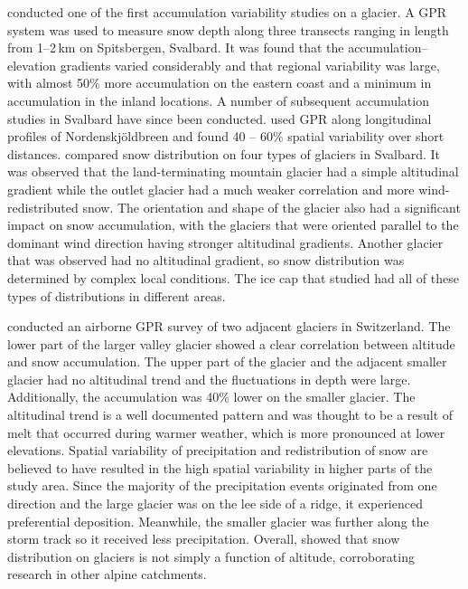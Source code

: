 \documentclass{sfuthesis}
\begin{document}
\cite{Winther1998} conducted one of the first accumulation variability studies on a glacier. A GPR system was used to measure snow depth along three transects  ranging in length from 1--2\,km on Spitsbergen, Svalbard. It was found that the accumulation--elevation gradients varied considerably and that regional variability was large, with almost 50$\%$ more accumulation on the eastern coast and a minimum in accumulation in the inland locations. A number of subsequent accumulation studies in Svalbard have since been conducted. \cite{Palli2002} used GPR along longitudinal profiles of Nordenskj\"{o}ldbreen and found 40 -- 60$\%$ spatial variability over short distances. \cite{Grabiec2011} compared snow distribution on four types of glaciers in Svalbard. It was observed that the land-terminating mountain glacier had a simple altitudinal gradient while the outlet glacier had a much weaker correlation and more wind-redistributed snow. The orientation and shape of the glacier also had a significant impact on snow accumulation, with the glaciers that were oriented parallel to the dominant wind direction having stronger altitudinal gradients. Another glacier that was observed had no altitudinal gradient, so snow distribution was determined by complex local conditions. The ice cap that \cite{Grabiec2011} studied had all of these types of distributions in different areas.

\cite{Machguth2006} conducted an airborne GPR survey of two adjacent glaciers in Switzerland. The lower part of the larger valley glacier showed a clear correlation between altitude and snow accumulation. The upper part of the glacier and the adjacent smaller glacier had no altitudinal trend and the fluctuations in depth were large. Additionally, the accumulation was 40$\%$ lower on the smaller glacier. The altitudinal trend is a well documented pattern and was thought to be a result of melt that occurred during warmer weather, which is more pronounced at lower elevations. Spatial variability of precipitation and redistribution of snow are believed to have resulted in the high spatial variability in higher parts of the study area. Since the majority of the precipitation events originated from one direction and the large glacier was on the lee side of a ridge, it experienced preferential deposition. Meanwhile, the smaller glacier was further along the storm track so it received less precipitation. Overall, \cite{Machguth2006} showed that snow distribution on glaciers is not simply a function of altitude, corroborating research in other alpine catchments.
\end{document}
